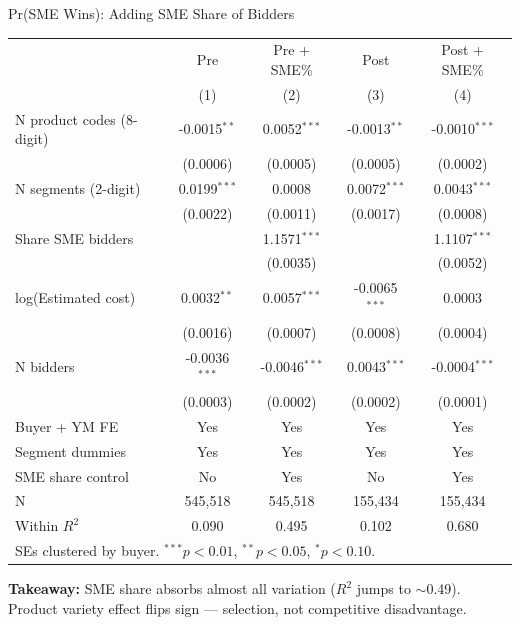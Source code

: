 \documentclass[9pt,aspectratio=169]{beamer}
\begin{document}
\begin{frame}{Pr(SME Wins): Adding SME Share of Bidders}
\centering\small
\begin{tabular}{lcccc}
\toprule
 & Pre & Pre + SME\% & Post & Post + SME\% \\
 & (1) & (2) & (3) & (4) \\
\midrule
N product codes (8-digit) & -0.0015$^{**}$ & 0.0052$^{***}$ & -0.0013$^{**}$ & -0.0010$^{***}$ \\
 & (0.0006) & (0.0005) & (0.0005) & (0.0002) \\[2pt]
N segments (2-digit) & 0.0199$^{***}$ & 0.0008 & 0.0072$^{***}$ & 0.0043$^{***}$ \\
 & (0.0022) & (0.0011) & (0.0017) & (0.0008) \\[2pt]
Share SME bidders &  & 1.1571$^{***}$ &  & 1.1107$^{***}$ \\
 &  & (0.0035) &  & (0.0052) \\[2pt]
log(Estimated cost) & 0.0032$^{**}$ & 0.0057$^{***}$ & -0.0065$^{***}$ & 0.0003 \\
 & (0.0016) & (0.0007) & (0.0008) & (0.0004) \\[2pt]
N bidders & -0.0036$^{***}$ & -0.0046$^{***}$ & 0.0043$^{***}$ & -0.0004$^{***}$ \\
 & (0.0003) & (0.0002) & (0.0002) & (0.0001) \\[2pt]
\midrule
Buyer + YM FE & Yes & Yes & Yes & Yes \\
Segment dummies & Yes & Yes & Yes & Yes \\
SME share control & No & Yes & No & Yes \\
N & 545,518 & 545,518 & 155,434 & 155,434 \\
Within $R^2$ & 0.090 & 0.495 & 0.102 & 0.680 \\
\bottomrule
\multicolumn{5}{l}{\footnotesize SEs clustered by buyer. $^{***}p<0.01$, $^{**}p<0.05$, $^{*}p<0.10$.} \\
\end{tabular}

\medskip
\small\textbf{Takeaway:} SME share absorbs almost all variation ($R^2$ jumps to $\sim$0.49). Product variety effect flips sign --- selection, not competitive disadvantage.
\end{frame}
\end{document}
